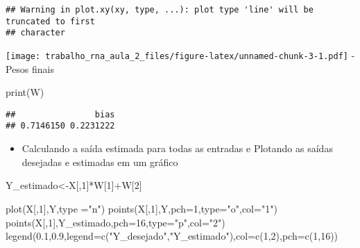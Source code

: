 \documentclass[
]{article}
\newenvironment{Shaded}{\begin{snugshade}}{\end{snugshade}}
\newcommand{\AttributeTok}[1]{\textcolor[rgb]{0.77,0.63,0.00}{#1}}
\newcommand{\DecValTok}[1]{\textcolor[rgb]{0.00,0.00,0.81}{#1}}
\newcommand{\FloatTok}[1]{\textcolor[rgb]{0.00,0.00,0.81}{#1}}
\newcommand{\FunctionTok}[1]{\textcolor[rgb]{0.00,0.00,0.00}{#1}}
\newcommand{\NormalTok}[1]{#1}
\newcommand{\OtherTok}[1]{\textcolor[rgb]{0.56,0.35,0.01}{#1}}
\newcommand{\SpecialCharTok}[1]{\textcolor[rgb]{0.00,0.00,0.00}{#1}}
\newcommand{\StringTok}[1]{\textcolor[rgb]{0.31,0.60,0.02}{#1}}
\providecommand{\tightlist}{%
  \setlength{\itemsep}{0pt}\setlength{\parskip}{0pt}}
\begin{document}
\begin{verbatim}
## Warning in plot.xy(xy, type, ...): plot type 'line' will be truncated to first
## character
\end{verbatim}

\texttt{[image: trabalho\_rna\_aula\_2\_files/figure-latex/unnamed-chunk-3-1.pdf]}
- Pesos finais

\begin{Shaded}
\begin{Highlighting}[]
\FunctionTok{print}\NormalTok{(W)}
\end{Highlighting}
\end{Shaded}

\begin{verbatim}
##                bias 
## 0.7146150 0.2231222
\end{verbatim}

\begin{itemize}
\tightlist
\item
  Calculando a saída estimada para todas as entradas e Plotando as
  saídas desejadas e estimadas em um gráfico
\end{itemize}

\begin{Shaded}
\begin{Highlighting}[]
\NormalTok{Y\_estimado}\OtherTok{\textless{}{-}}\NormalTok{X[,}\DecValTok{1}\NormalTok{]}\SpecialCharTok{*}\NormalTok{W[}\DecValTok{1}\NormalTok{]}\SpecialCharTok{+}\NormalTok{W[}\DecValTok{2}\NormalTok{]}

\FunctionTok{plot}\NormalTok{(X[,}\DecValTok{1}\NormalTok{],Y,}\AttributeTok{type =}\StringTok{"n"}\NormalTok{)}
\FunctionTok{points}\NormalTok{(X[,}\DecValTok{1}\NormalTok{],Y,}\AttributeTok{pch=}\DecValTok{1}\NormalTok{,}\AttributeTok{type=}\StringTok{"o"}\NormalTok{,}\AttributeTok{col=}\StringTok{"1"}\NormalTok{)}
\FunctionTok{points}\NormalTok{(X[,}\DecValTok{1}\NormalTok{],Y\_estimado,}\AttributeTok{pch=}\DecValTok{16}\NormalTok{,}\AttributeTok{type=}\StringTok{"p"}\NormalTok{,}\AttributeTok{col=}\StringTok{"2"}\NormalTok{)}
\FunctionTok{legend}\NormalTok{(}\FloatTok{0.1}\NormalTok{,}\FloatTok{0.9}\NormalTok{,}\AttributeTok{legend=}\FunctionTok{c}\NormalTok{(}\StringTok{"Y\_desejado"}\NormalTok{,}\StringTok{"Y\_estimado"}\NormalTok{),}\AttributeTok{col=}\FunctionTok{c}\NormalTok{(}\DecValTok{1}\NormalTok{,}\DecValTok{2}\NormalTok{),}\AttributeTok{pch=}\FunctionTok{c}\NormalTok{(}\DecValTok{1}\NormalTok{,}\DecValTok{16}\NormalTok{))}
\end{Highlighting}
\end{Shaded}
\end{document}
